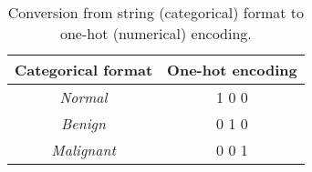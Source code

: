 \begin{table}[h]
\centering
\begin{tabular}{|c|c|}
\hline
\textbf{Categorical format} & \textbf{One-hot encoding} \\ \hline
\textit{Normal}             & 1 0 0            \\ \hline
\textit{Benign}             & 0 1 0            \\ \hline
\textit{Malignant}          & 0 0 1            \\ \hline
\end{tabular}
\caption{Conversion from string (categorical) format to one-hot (numerical) encoding.}
\label{tab:label-encoding-example}
\end{table}